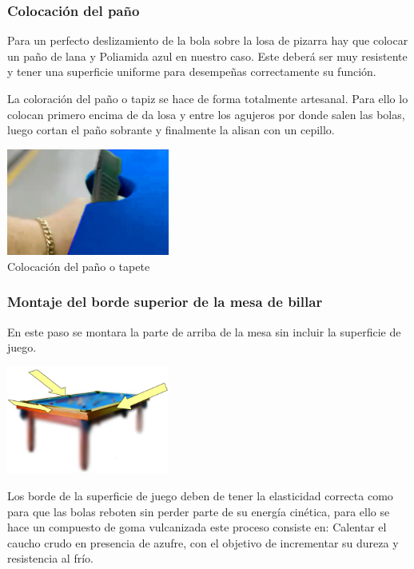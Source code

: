 		\subsubsection {Colocación del paño}
  	
 	Para un perfecto deslizamiento de la bola sobre la losa de pizarra hay que colocar un paño de lana y Poliamida azul en nuestro caso. Este deberá ser muy resistente y tener una superficie uniforme para desempeñas correctamente su función.

	La coloración del paño o tapiz se hace de forma totalmente artesanal. Para ello lo colocan primero encima de da losa y entre los agujeros por donde salen las bolas, luego cortan el paño sobrante y finalmente la alisan con un cepillo. 

	\begin{center}
    			\includegraphics[width=0.4\textwidth]{Pantallazo.png}
			    \\ \small {Colocación del paño o tapete}
		\end{center}
\clearpage
		\subsubsection {Montaje del  borde superior de la mesa de billar}

	En este paso se montara la parte de arriba de la mesa  sin incluir la superficie de juego.

	\begin{center}
    		\includegraphics[width=0.4\textwidth]{P1.png}
	\end{center}
	
	Los borde de la superficie de juego deben de tener la elasticidad correcta como para que las bolas reboten sin perder parte de su energía cinética, para ello se hace un compuesto de goma vulcanizada este proceso consiste en:
Calentar el caucho crudo en presencia de azufre, con el objetivo de incrementar su dureza y resistencia al frío.

